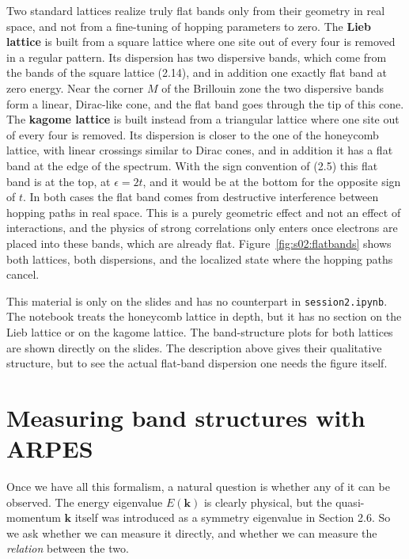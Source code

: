 Two standard lattices realize truly flat bands only from their geometry in real space, and not from
a fine-tuning of hopping parameters to zero. The \textbf{Lieb lattice} is built from a square lattice
where one site out of every four is removed in a regular pattern. Its dispersion has two dispersive
bands, which come from the bands of the square lattice (2.14), and in addition one exactly flat band
at zero energy. Near the corner $M$ of the Brillouin zone the two dispersive bands form a linear,
Dirac-like cone, and the flat band goes through the tip of this cone. The \textbf{kagome lattice} is built instead from a triangular lattice where one site out of
every four is removed. Its dispersion is closer to the one of the honeycomb lattice, with linear
crossings similar to Dirac cones, and in addition it has a flat band at the edge of the spectrum.
With the sign convention of (2.5) this flat band is at the top, at $\epsilon=2t$, and it would be at
the bottom for the opposite sign of $t$. In both cases the flat band
comes from destructive interference between hopping paths in real space. This is a purely geometric
effect and not an effect of interactions, and the physics of strong correlations only enters once
electrons are placed into these bands, which are already flat. Figure~\ref{fig:s02:flatbands} shows
both lattices, both dispersions, and the localized state where the hopping paths cancel.



This material is only on the slides and has no counterpart in \texttt{session2.ipynb}. The notebook
treats the honeycomb lattice in depth, but it has no section on the Lieb lattice or on the kagome
lattice. The band-structure plots for both lattices are shown directly on the slides. The description
above gives their qualitative structure, but to see the actual flat-band dispersion one needs the
figure itself.

\section{Measuring band structures with ARPES}

Once we have all this formalism, a natural question is whether any of it can be observed. The energy
eigenvalue $E(\mathbf{k})$ is clearly physical, but the quasi-momentum $\mathbf{k}$ itself was
introduced as a symmetry eigenvalue in Section 2.6. So we ask whether we can measure it directly, and
whether we can measure the \emph{relation} between the two.

